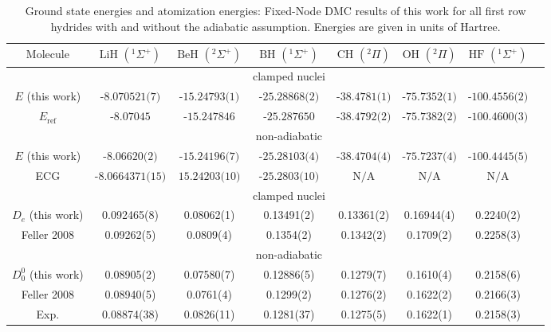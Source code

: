 \documentclass[pra,superscriptaddress,groupedaddress,twocolumn]{revtex4}
\begin{document}
\begin{table}[t!]
\setlength{\extrarowheight}{1pt}
\begin{threeparttable}
\caption{Ground state energies and atomization energies: Fixed-Node DMC results of this work for all first row hydrides with and without the adiabatic assumption. Energies are given in units of Hartree. \label{tab:atomization}}
\begin{tabular*}{\textwidth}{@{\extracolsep{\fill}} cccccccc}
\hline\hline
$\text{Molecule}$ & $\text{LiH }(^1\Sigma^+)$ & $\text{BeH }(^2\Sigma^+)$ & $\text{BH }(^1\Sigma^+)$ & $\text{CH }(^2\Pi)$ & $\text{OH }(^2\Pi)$ & $\text{HF }(^1\Sigma^+)$ \\ \hline
&&&clamped nuclei&&& \\
$E$ (this work) & $\text{-8.070521(7)}$ & $\text{-15.24793(1)}$ & $\text{-25.28868(2)}$ & $\text{-38.4781(1)}$ & $\text{-75.7352(1)}$ & $\text{-100.4556(2)}$ \\
$E_{\text{ref}}$ \tnote{a} \cite{Adamowicz_LiH,Koput_BeH,Miliordos_BH,Davidson_Atoms,Feller_Corrections} & $\text{-8.07045}$ & $\text{-15.247846}$ & $\text{-25.287650}$ & $\text{-38.4792(2)}$ & $\text{-75.7382(2)}$ & $\text{-100.4600(3)}$ \\
&&&non-adiabatic&&& \\
$E$ (this work) & $\text{-8.06620(2)}$ & $\text{-15.24196(7)}$ & $\text{-25.28103(4)}$ & $\text{-38.4704(4)}$ & $\text{-75.7237(4)}$ & $\text{-100.4445(5)}$ \\
ECG \cite{Bubin_LiH_noBO,Bubin_BeH_noBO,Bubin_BH_noBO} & $\text{-8.0664371(15)}$ & $\text{15.24203(10)}$ & $\text{-25.2803(10)}$ & $\text{N/A}$ & $\text{N/A}$ & $\text{N/A}$ \\
\hline
&&&clamped nuclei&&& \\
$D_{e}$ (this work) & 0.092465(8) & 0.08062(1) & 0.13491(2) & 0.13361(2) & 0.16944(4) & 0.2240(2) \\
Feller 2008\tnote{b} \cite{Feller_Corrections} & 0.09262(5) & 0.0809(4) & 0.1354(2) & 0.1342(2) & 0.1709(2) & 0.2258(3) \\
&&&non-adiabatic&&& \\
$D_{0}^0$ (this work) & 0.08905(2)  & 0.07580(7)  & 0.12886(5) & 0.1279(7) & 0.1610(4) & 0.2158(6) \\
Feller 2008\tnote{c} \cite{Feller_Corrections} & 0.08940(5) & 0.0761(4) & 0.1299(2) & 0.1276(2) & 0.1622(2) & 0.2166(3)\\
Exp. \cite{CCCBDB} & 0.08874(38) & 0.0826(11) & 0.1281(37) & 0.1275(5) & 0.1622(1) & 0.2158(3) \\

\end{tabular*}
\end{threeparttable}
\end{table}
\end{document}
